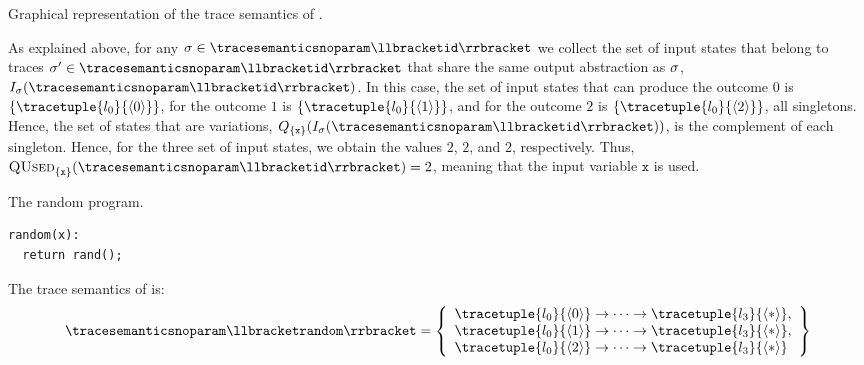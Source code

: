 \begin{example}
\begin{marginfigure}[*-4]
  \caption{Graphical representation of the trace semantics of .}
  \end{marginfigure}
  As explained above, for any $\deftrace\in \tracesemanticsnoparam\semanticsof{\texttt{id}}$ we collect the set of input states that belong to traces $\deftrace'\in\tracesemanticsnoparam\semanticsof{\texttt{id}}$ that share the same output abstraction as $\sigma$, \cf{} $I_{\deftrace}(\tracesemanticsnoparam\semanticsof{\texttt{id}})$.
  In this case, the set of input states that can produce the outcome $0$ is $\{\tracetuple{\locinit}{\langle 0\rangle}\}$, for the outcome $1$ is $\{\tracetuple{\locinit}{\langle 1\rangle}\}$, and for the outcome $2$ is $\{\tracetuple{\locinit}{\langle 2\rangle}\}$, all singletons.
  Hence, the set of states that are variations, \cf{} $Q_{\{\texttt{x}\}}(I_{\deftrace}(\tracesemanticsnoparam\semanticsof{\texttt{id}}))$, is the complement of each singleton.
  Hence, for the three set of input states, we obtain the values $2$, $2$, and $2$, respectively.
  Thus, $\qusedname_{\{\texttt{x}\}}(\tracesemanticsnoparam\semanticsof{\texttt{id}})=2$, meaning that the input variable $\texttt{x}$ is used.

\begin{marginlisting}[*-3]
  \caption{The random program.}
  \vspace{15pt}
\begin{lstlisting}[style=mystyle,language=customPython]
random(x):
  return rand();
  \end{lstlisting}
\end{marginlisting}
  The trace semantics of  is:
  \begin{align*}
    \tracesemanticsnoparam\semanticsof{\texttt{random}}
    =
    \left\{
      \begin{array}{l}
        \tracetuple{\locinit}{\langle 0\rangle}\tracearrow\tracetuple{\loc{3}}{\langle \anyvalue\rangle}, \\
        \tracetuple{\locinit}{\langle 1\rangle}\tracearrow\tracetuple{\loc{3}}{\langle \anyvalue\rangle}, \\
        \tracetuple{\locinit}{\langle 2\rangle}\tracearrow\tracetuple{\loc{3}}{\langle \anyvalue\rangle}
      \end{array}
    \right\}
  \end{align*}


\end{example}
